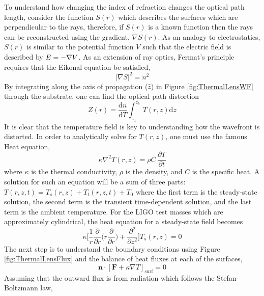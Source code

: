 	To understand how changing the index of refraction changes the optical path length, consider the function $S(r)$ which describes the surfaces which are perpendicular to the rays, therefore, if $S(r)$ is a known function then the rays can be reconstructed using the gradient, $\nabla S(r)$.  As an analogy to electrostatics, $S(r)$ is similar to the potential function $V$ such that the electric field is described by $\boldmath{E}=-\nabla V$.  As an extension of ray optics, Fermat's principle requires that the Eikonal equation be satisfied,
	\begin{equation}
	\vert \nabla S \vert^2 = n^2
	\end{equation}
	By integrating along the axis of propagation ($\hat{z}$) in Figure \ref{fig:ThermalLensWF} through the substrate, one can find the optical path distortion
	\begin{equation}\label{eq:thermoref}
	Z(r) =  \frac{\text{d}n}{\text{d}T} \int_{z_a}^{z_b} \, T(r,z) \text{d}z
	\end{equation}
	It is clear that the temperature field is key to understanding how the wavefront is distorted. In order to analytically solve for $T(r,z)$, one must use the famous Heat equation,
	\begin{equation}\label{eq:heat_eq}
		\kappa \nabla^2 T(r,z) = \rho C\, \frac{\partial T}{\partial t} 
	\end{equation}
	where $\kappa$ is the thermal conductivity, $\rho$ is the density, and $C$ is the specific heat.  A solution for such an equation will be a sum of three parts: $T(r,z,t) = T_{s}(r,z) + T_{t}(r,z,t) + T_0$ where the first term is the steady-state solution, the second term is the transient time-dependent solution, and the last term is the ambient temperature.  For the LIGO test masses which are approximately cylindrical, the heat equation for a steady-state field becomes
	\begin{equation}
		\kappa \bigg[ \frac{1}{r} \frac{\partial}{\partial r} \bigg( r \frac{\partial}{\partial r}\bigg) +  \frac{\partial^2}{\partial z^2} \bigg] T_{s}(r,z) = 0
	\end{equation}
	The next step is to understand the boundary conditions using Figure \ref{fig:ThermalLensFlux} and the balance of heat fluxes at each of the surfaces,
	\begin{equation}
	\textbf{n} \cdot [ \textbf{F} + \kappa \nabla T]_{\text{surf}} = 0 
	\end{equation}
	Assuming that the outward flux is from radiation which follows the Stefan-Boltzmann law,
